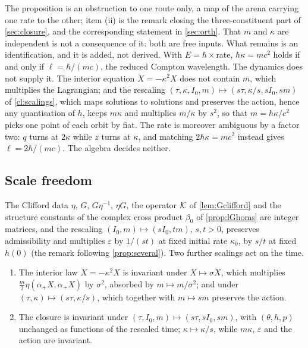 The proposition is an obstruction to one route only, a map of the arena carrying one rate to the other; item (ii) is the remark closing the
three-constituent part of \cref{sec:closure}, and the corresponding statement in \cref{sec:orth}. That $m$ and $\kappa$ are independent is
not a consequence of it: both are free inputs. What remains is an identification, and it is added, not derived. With $E=\hbar\times$rate,
$\hbar\kappa=mc^2$ holds if and only if $\ell=\hbar/(mc)$, the reduced Compton wavelength. The dynamics does not supply it. The interior equation
$\ddot X=-\kappa^2X$ does not contain $m$, which multiplies the Lagrangian; and the rescaling $(\tau,\kappa,I_0,m)\mapsto(s\tau,\kappa/s,sI_0,sm)$ of
\cref{cl:scalings}, which maps solutions to solutions and preserves the action, hence any quantisation of $h$, keeps $m\kappa$ and multiplies
$m/\kappa$ by $s^2$, so that $m=\hbar\kappa/c^2$ picks one point of each orbit by fiat. The rate is moreover ambiguous by a factor two: $q$ turns at
$2\kappa$ while $z$ turns at $\kappa$, and matching $2\hbar\kappa=mc^2$ instead gives $\ell=2\hbar/(mc)$. The algebra decides neither.

\subsection{Scale freedom}
\label{sec:restscale}

The Clifford data $\eta$, $G$, $G\eta^{-1}$, $\eta G$, the operator $\mathcal K$ of \cref{lem:Gclifford} and the structure constants of the complex cross
product $\beta_0$ of \cref{prop:lGhoms} are integer matrices, and the rescaling $(I_0,m)\mapsto(sI_0,tm)$, $s,t>0$, preserves admissibility and
multiplies $\varepsilon$ by $1/(st)$ at fixed initial rate $\kappa_0$, by $s/t$ at fixed $h(0)$ (the remark following \cref{prop:several}). Two
further scalings act on the time.

\begin{proposition}[Scalings]
\label{cl:scalings}
\begin{enumerate}[label=(\roman*),leftmargin=2.2em]
\item The interior law $\ddot X=-\kappa^2X$ is invariant under $X\mapsto\sigma X$, which multiplies $\tfrac m2\eta(\alpha_+X,\alpha_+X)$ by
$\sigma^2$, absorbed by $m\mapsto m/\sigma^2$; and under $(\tau,\kappa)\mapsto(s\tau,\kappa/s)$, which together with $m\mapsto sm$ preserves the
action.
\item The closure is invariant under $(\tau,I_0,m)\mapsto(s\tau,sI_0,sm)$, with $(\theta,h,p)$ unchanged as functions of the rescaled time;
$\kappa\mapsto\kappa/s$, while $m\kappa$, $\varepsilon$ and the action are invariant.
\end{enumerate}
\end{proposition}

